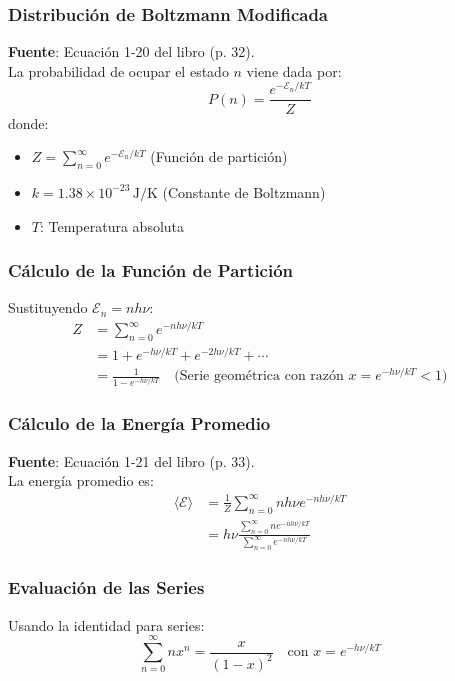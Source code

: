 \documentclass{article}
\begin{document}
	\subsubsection*{Distribución de Boltzmann Modificada}
	\textbf{Fuente}: Ecuación 1-20 del libro (p. 32).\\
	La probabilidad de ocupar el estado \(n\) viene dada por:
	\begin{equation}
		P(n) = \frac{e^{-\mathcal{E}_n/kT}}{Z}
	\end{equation}
	donde:
	\begin{itemize}
		\item \(Z = \sum_{n=0}^\infty e^{-\mathcal{E}_n/kT}\) (Función de partición)
		\item \(k = 1.38 \times 10^{-23}\, \text{J/K}\) (Constante de Boltzmann)
		\item \(T\): Temperatura absoluta
	\end{itemize}
	
	\subsubsection*{Cálculo de la Función de Partición}
	Sustituyendo \(\mathcal{E}_n = nh\nu\):
	\begin{align}
		Z &= \sum_{n=0}^\infty e^{-nh\nu/kT} \nonumber \\
		&= 1 + e^{-h\nu/kT} + e^{-2h\nu/kT} + \cdots \nonumber \\
		&= \frac{1}{1 - e^{-h\nu/kT}} \quad \text{(Serie geométrica con razón } x = e^{-h\nu/kT} < 1)
	\end{align}
	
	\subsubsection*{Cálculo de la Energía Promedio}
	\textbf{Fuente}: Ecuación 1-21 del libro (p. 33).\\
	La energía promedio es:
	\begin{align}
		\langle \mathcal{E} \rangle &= \frac{1}{Z}\sum_{n=0}^\infty nh\nu e^{-nh\nu/kT} \nonumber \\
		&= h\nu \frac{\sum_{n=0}^\infty n e^{-nh\nu/kT}}{\sum_{n=0}^\infty e^{-nh\nu/kT}} 
	\end{align}
	
	\subsubsection*{Evaluación de las Series}
	Usando la identidad para series:
	\begin{equation}
		\sum_{n=0}^\infty n x^n = \frac{x}{(1 - x)^2} \quad \text{con } x = e^{-h\nu/kT}
	\end{equation}
	
\end{document}
